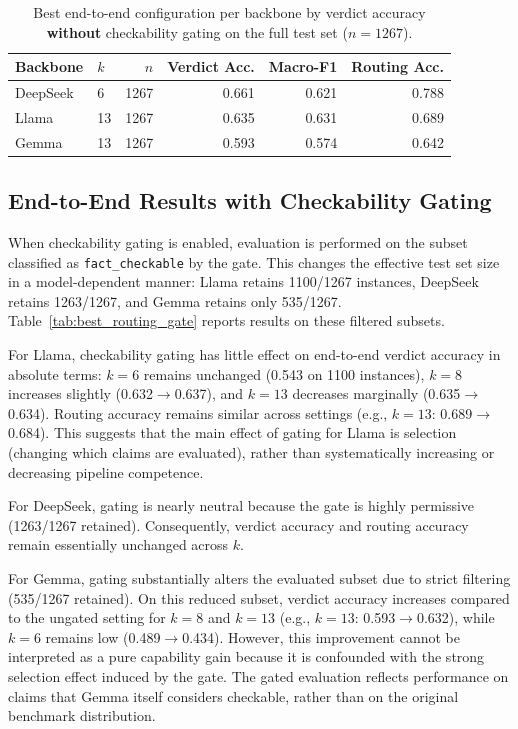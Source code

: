 \FloatBarrier
\begin{table}[t]
\centering
\caption{Best end-to-end configuration per backbone by verdict accuracy 
\textbf{without} checkability gating on the full test set ($n{=}1267$).}
\label{tab:best_routing_no_gate}
\small
\begin{tabular}{llrrrr}
\toprule
Backbone & $k$ & $n$ & Verdict Acc. & Macro-F1 & Routing Acc. \\
\midrule
DeepSeek & 6  & 1267 & 0.661 & 0.621 & 0.788 \\
Llama    & 13 & 1267 & 0.635 & 0.631 & 0.689 \\
Gemma    & 13 & 1267 & 0.593 & 0.574 & 0.642 \\
\bottomrule
\end{tabular}
\normalsize
\end{table}

\subsection{End-to-End Results with Checkability Gating}
When checkability gating is enabled, evaluation is performed on the subset classified as
\texttt{fact\_checkable} by the gate. This changes the effective test set size in a
model-dependent manner: Llama retains 1100/1267 instances, DeepSeek retains 1263/1267, and Gemma
retains only 535/1267. Table~\ref{tab:best_routing_gate} reports results on these filtered
subsets.

For Llama, checkability gating has little effect on end-to-end verdict accuracy in absolute terms:
$k{=}6$ remains unchanged (0.543 on 1100 instances), $k{=}8$ increases slightly (0.632$\rightarrow$0.637),
and $k{=}13$ decreases marginally (0.635$\rightarrow$0.634). Routing accuracy remains similar across
settings (e.g., $k{=}13$: 0.689$\rightarrow$0.684). This suggests that the main effect of gating for
Llama is selection (changing which claims are evaluated), rather than systematically increasing
or decreasing pipeline competence.

For DeepSeek, gating is nearly neutral because the gate is highly permissive (1263/1267 retained).
Consequently, verdict accuracy and routing accuracy remain essentially unchanged across $k$.

For Gemma, gating substantially alters the evaluated subset due to strict filtering (535/1267
retained). On this reduced subset, verdict accuracy increases compared to the ungated setting for
$k{=}8$ and $k{=}13$ (e.g., $k{=}13$: 0.593$\rightarrow$0.632), while $k{=}6$ remains low (0.489$\rightarrow$0.434).
However, this improvement cannot be interpreted as a pure capability gain because it is confounded
with the strong selection effect induced by the gate. The gated evaluation reflects performance on
claims that Gemma itself considers checkable, rather than on the original benchmark distribution.

